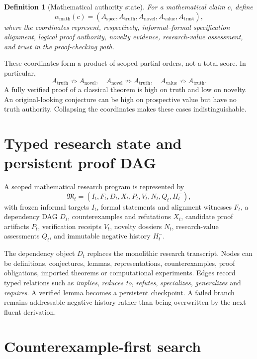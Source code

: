 \documentclass[11pt]{article}
\newtheorem{definition}{Definition}
\begin{document}
\begin{definition}[Mathematical authority state]
For a mathematical claim $c$, define
\[
\alpha_{\mathrm{math}}(c)=
(A_{\mathrm{spec}},A_{\mathrm{truth}},A_{\mathrm{novel}},A_{\mathrm{value}},A_{\mathrm{trust}}),
\]
where the coordinates represent, respectively, informal--formal specification alignment, logical proof authority, novelty evidence, research-value assessment, and trust in the proof-checking path.
\end{definition}

These coordinates form a product of scoped partial orders, not a total score. In particular,
\[
A_{\mathrm{truth}}\not\Rightarrow A_{\mathrm{novel}},
\quad
A_{\mathrm{novel}}\not\Rightarrow A_{\mathrm{truth}},
\quad
A_{\mathrm{value}}\not\Rightarrow A_{\mathrm{truth}}.
\]
A fully verified proof of a classical theorem is high on truth and low on novelty. An original-looking conjecture can be high on prospective value but have no truth authority. Collapsing the coordinates makes these cases indistinguishable.

\section{Typed research state and persistent proof DAG}

A scoped mathematical research program is represented by
\[
\mathfrak M_t=(I_t,F_t,D_t,X_t,P_t,V_t,N_t,Q_t,H^-_t),
\]
with frozen informal targets $I_t$, formal statements and alignment witnesses $F_t$, a dependency DAG $D_t$, counterexamples and refutations $X_t$, candidate proof artifacts $P_t$, verification receipts $V_t$, novelty dossiers $N_t$, research-value assessments $Q_t$, and immutable negative history $H^-_t$.

The dependency object $D_t$ replaces the monolithic research transcript. Nodes can be definitions, conjectures, lemmas, representations, counterexamples, proof obligations, imported theorems or computational experiments. Edges record typed relations such as \emph{implies}, \emph{reduces to}, \emph{refutes}, \emph{specializes}, \emph{generalizes} and \emph{requires}. A verified lemma becomes a persistent checkpoint. A failed branch remains addressable negative history rather than being overwritten by the next fluent derivation.

\section{Counterexample-first search}
\end{document}
